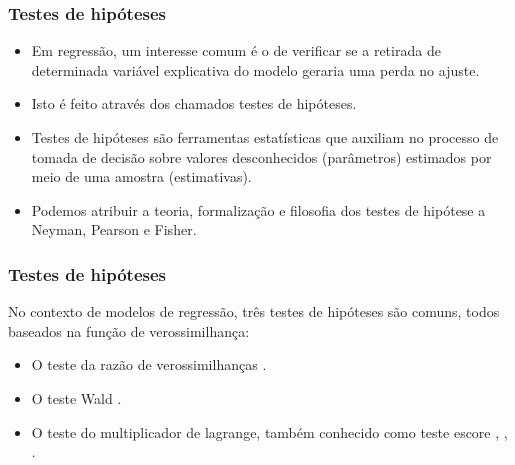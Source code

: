 \documentclass[handout,serif, professionalfont, usenames, dvipsnames, aspectratio = 169]{beamer}\usepackage[]{graphicx}\usepackage[]{color}
\begin{document}

\begin{frame}
  \frametitle{Testes de hipóteses}

  \begin{itemize}
    \itemsep 2ex

  \item Em regressão, um interesse comum é o de verificar se a retirada de determinada variável explicativa do modelo geraria uma perda no ajuste. 
  
  \item Isto é feito através dos chamados testes de hipóteses. 

  \item Testes de hipóteses são ferramentas estatísticas que auxiliam no processo de tomada de decisão sobre valores desconhecidos (parâmetros) estimados por meio de uma amostra (estimativas).
  
  \item Podemos atribuir a teoria, formalização e filosofia dos testes de hipótese a Neyman, Pearson e Fisher.
  
  \end{itemize}
\end{frame}


\begin{frame}
  \frametitle{Testes de hipóteses}

No contexto de modelos de regressão, três testes de hipóteses são comuns, todos baseados na função de verossimilhança: 

\begin{itemize}
  \item O teste da razão de verossimilhanças \cite{trv}.
  \item O teste Wald \cite{wald}.
  \item O teste do multiplicador de lagrange, também conhecido como teste escore \cite{score1}, \cite{score2}, \cite{score3}.
\end{itemize}


\end{frame}

\end{document}
